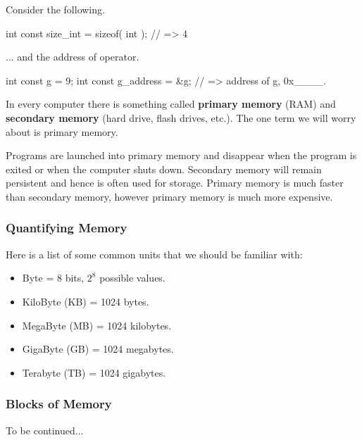 
Consider the following.\\

\begin{code}[c]
int const size_int = sizeof( int ); // => 4
\end{code}

... and the address of operator.\\

\begin{code}[c]
int const g = 9;
int const g_address = &g; // => address of g, 0x____.
\end{code}





In every computer there is something called \textbf{primary memory} (RAM) and \textbf{secondary memory} (hard drive, flash drives, etc.). The one term we will worry about is primary memory.\\


Programs are launched into primary memory and disappear when the program is exited or when the computer shuts down. Secondary memory will remain persistent and hence is often used for storage. Primary memory is much faster than secondary memory, however primary memory is much more expensive.\\

\subsubsection*{Quantifying Memory}

Here is a list of some common units that we should be familiar with:

\begin{itemize}

\item Byte = 8 bits, $2^{8}$ possible values.
\item KiloByte (KB) = 1024 bytes.
\item MegaByte (MB) = 1024 kilobytes.
\item GigaByte (GB) = 1024 megabytes.
\item Terabyte (TB) = 1024 gigabytes.

\end{itemize}

\subsubsection*{Blocks of Memory}

To be continued...